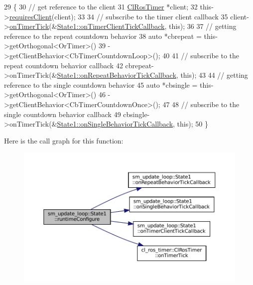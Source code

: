 \begin{DoxyCode}
29     \{
30         \textcolor{comment}{// get reference to the client}
31         \hyperlink{classcl__ros__timer_1_1ClRosTimer}{ClRosTimer} *client;
32         this->\hyperlink{classsmacc_1_1ISmaccState_a7f95c9f0a6ea2d6f18d1aec0519de4ac}{requiresClient}(client);
33 
34         \textcolor{comment}{// subscribe to the timer client callback}
35         client->\hyperlink{classcl__ros__timer_1_1ClRosTimer_a7edcc057bfb5a25fe0892755137dd8da}{onTimerTick}(&\hyperlink{structsm__update__loop_1_1State1_af132641f3167a2224249c70d072b6574}{State1::onTimerClientTickCallback},
       \textcolor{keyword}{this});
36 
37         \textcolor{comment}{// getting reference to the repeat countdown behavior}
38         \textcolor{keyword}{auto} *cbrepeat = this->getOrthogonal<OrTimer>()
39                              ->getClientBehavior<CbTimerCountdownLoop>();
40 
41         \textcolor{comment}{// subscribe to the repeat countdown behavior callback}
42         cbrepeat->onTimerTick(&\hyperlink{structsm__update__loop_1_1State1_aba8ce8c18482665237b1a5cb28deb657}{State1::onRepeatBehaviorTickCallback}, \textcolor{keyword}{
      this});
43 
44         \textcolor{comment}{// getting reference to the single countdown behavior}
45         \textcolor{keyword}{auto} *cbsingle = this->getOrthogonal<OrTimer>()
46                              ->getClientBehavior<CbTimerCountdownOnce>();
47 
48         \textcolor{comment}{// subscribe to the single countdown behavior callback}
49         cbsingle->onTimerTick(&\hyperlink{structsm__update__loop_1_1State1_ad15fb64f4f918c423038180d434d7220}{State1::onSingleBehaviorTickCallback}, \textcolor{keyword}{
      this});
50     \}
\end{DoxyCode}
Here is the call graph for this function\+:
\nopagebreak
\begin{figure}[H]
\begin{center}
\leavevmode
\includegraphics[width=350pt]{structsm__update__loop_1_1State1_a9a4c0a2a171bc9c2d7686562000075b4_cgraph}
\end{center}
\end{figure}
\mbox{\label{structsm__update__loop_1_1State1_a54b1ae508eb3d814fb2d811d78298b0e}} 
